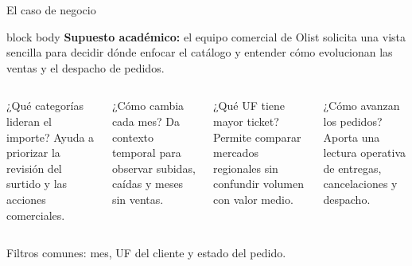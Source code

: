 \documentclass[aspectratio=169,10pt]{beamer}
\begin{document}
\begin{frame}{El caso de negocio}
  \begin{beamercolorbox}[rounded=true,sep=.65em,wd=\linewidth]{block body}
    \textbf{Supuesto académico:} el equipo comercial de Olist solicita una vista
    sencilla para decidir dónde enfocar el catálogo y entender cómo evolucionan
    las ventas y el despacho de pedidos.
  \end{beamercolorbox}
  \vspace{.65em}
  \begin{columns}[T,onlytextwidth]
      \begin{block}{¿Qué categorías lideran el importe?}
        Ayuda a priorizar la revisión del surtido y las acciones comerciales.
      \end{block}
      \begin{block}{¿Cómo cambia cada mes?}
        Da contexto temporal para observar subidas, caídas y meses sin ventas.
      \end{block}
      \begin{block}{¿Qué UF tiene mayor ticket?}
        Permite comparar mercados regionales sin confundir volumen con valor medio.
      \end{block}
      \begin{block}{¿Cómo avanzan los pedidos?}
        Aporta una lectura operativa de entregas, cancelaciones y despacho.
      \end{block}
  \end{columns}
  \vspace{.2em}
  {\centering\small\color{OlistGray}
  Filtros comunes: mes, UF del cliente y estado del pedido.\par}
\end{frame}
\end{document}
